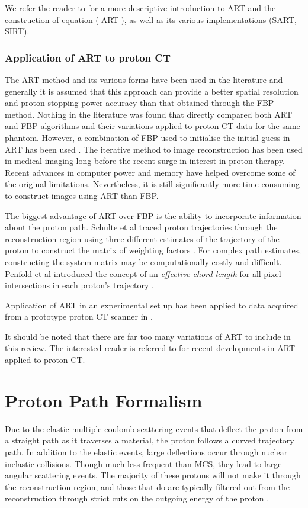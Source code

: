 \documentclass[11pt,a4paper]{article}
\begin{document}
We refer the reader to \cite{avinash1988principles} for a more descriptive introduction to ART and the construction of equation (\ref{ART}), as well as its various implementations (SART, SIRT).

\subsubsection{Application of ART to proton CT}
The ART method and its various forms have been used in the literature and generally it is assumed that this approach can provide a better spatial resolution and proton stopping power accuracy than that obtained through the FBP method. Nothing in the literature was found that directly compared both ART and FBP algorithms and their variations applied to proton CT data for the same phantom. However, a combination of FBP used to initialise the initial guess in ART has been used \cite{penfold2009characteristics}. The iterative method to image reconstruction has been used in medical imaging long before the recent surge in interest in proton therapy. Recent advances in computer power and memory have helped overcome some of the original limitations. Nevertheless, it is still significantly more time consuming to construct images using ART than FBP.

The biggest advantage of ART over FBP is the ability to incorporate information about the proton path. Schulte et al traced proton trajectories through the reconstruction region using three different estimates of the trajectory of the proton to construct the matrix of weighting factors \cite{li2006reconstruction}. For complex path estimates, constructing the system matrix may be computationally costly and difficult. Penfold et al introduced the concept of an \textit{effective chord length} for all pixel intersections in each proton's trajectory \cite{penfold2009more}.

Application of ART in an experimental set up has been applied to data acquired from a prototype proton CT scanner in \cite{hurley2012water}.

It should be noted that there are far too many variations of ART to include in this review. The interested reader is referred to \cite{penfold2015techniques} for recent developments in ART applied to proton CT.

\section{Proton Path Formalism}
\label{pathformalism}
Due to the elastic multiple coulomb scattering events that deflect the proton from a straight path as it traverses a material, the proton follows a curved trajectory path. In addition to the elastic events, large deflections occur through nuclear inelastic collisions. Though much less frequent than MCS, they lead to large angular scattering events. The majority of these protons will not make it through the reconstruction region, and those that do are typically filtered out from the reconstruction through strict cuts on the outgoing energy of the proton \cite{li2006reconstruction}. 
\end{document}
